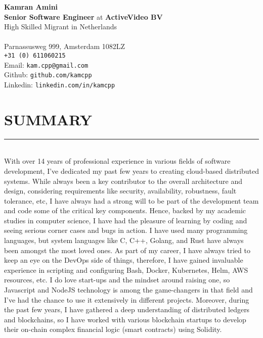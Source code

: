 \documentclass[10pt,a4paper]{article}
\begin{document}
\noindent \textbf{Kamran Amini} \\
\noindent \small \textbf{Senior Software Engineer} at \textbf{ActiveVideo BV} \\
\noindent \small High Skilled Migrant in Netherlands \\ \\
Parnassusweg 999, Amsterdam 1082LZ \\
\texttt{+31 (0) 611060215} \\
Email: \texttt{kam.cpp@gmail.com} \\
Github: \texttt{github.com/kamcpp} \\
Linkedin: \texttt{linkedin.com/in/kamcpp} 

\section{SUMMARY}
\noindent \rule {18.0cm}{0.2pt} \\
\small With over 14 years of professional experience in various fields of software development, I've dedicated my past few years to creating cloud-based distributed systems. While always been a key contributor to the overall architecture and design, considering requirements like security, availability, robustness, fault tolerance, etc, I have always had a strong will to be part of the development team and code some of the critical key components. Hence, backed by my academic studies in computer science, I have had the pleasure of learning by coding and seeing serious corner cases and bugs in action. I have used many programming languages, but system languages like C, C++, Golang, and Rust have always been amongst the most loved ones. As part of my career, I have always tried to keep an eye on the DevOps side of things, therefore, I have gained invaluable experience in scripting and configuring Bash, Docker, Kubernetes, Helm, AWS resources, etc. I do love start-ups and the mindset around raising one, so Javascript and NodeJS technology is among the game-changers in that field and I've had the chance to use it extensively in different projects. Moreover, during the past few years, I have gathered a deep understanding of distributed ledgers and blockchains, so I have worked with various blockchain startups to develop their on-chain complex financial logic (smart contracts) using Solidity.

\small
\end{document}
